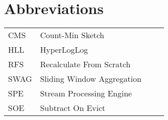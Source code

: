 \chapter*{Abbreviations}

\begin{flushleft}
\begin{tabular}{l p{0.8\linewidth}}
CMS      & Count-Min Sketch\\
HLL      & HyperLogLog\\
RFS      & Recalculate From Scratch\\
SWAG     & Sliding Window Aggregation\\
SPE      & Stream Processing Engine\\
SOE      & Subtract On Evict\\
\end{tabular}
\end{flushleft}

